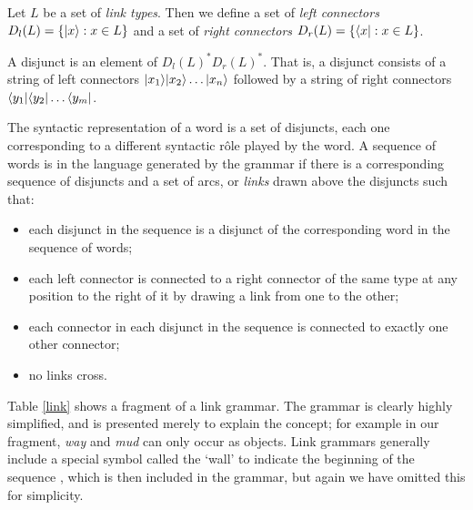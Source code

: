 \documentclass[12pt]{report}
\begin{document}
\begin{defn}
Let $L$ be a set of \emph{link types}. Then we define a set of \emph{left connectors} $D_l(L) = \{|x \rangle : x \in L\}$ and a set of \emph{right connectors} $D_r(L) = \{\langle x| : x \in L\}$.

A disjunct is an element of $D_l(L)^*D_r(L)^*$. That is, a disjunct consists of a string of left connectors $|x_1 \rangle|x_2 \rangle\ldots|x_n \rangle$ followed by a string of right connectors $\langle y_1|\langle y_2|\ldots\langle y_m|$.

The syntactic representation of a word is a set of disjuncts, each one corresponding to a different syntactic r\^ole played by the word. A sequence of words is in the language generated by the grammar if there is a corresponding sequence of disjuncts and a set of arcs, or \emph{links} drawn above the disjuncts such that:
\begin{itemize}
\item each disjunct in the sequence is a disjunct of the corresponding word in the sequence of words;
\item each left connector is connected to a right connector of the same type at any position to the right of it by drawing a link from one to the other;
\item each connector in each disjunct in the sequence is connected to exactly one other connector;
\item no links cross.
\end{itemize}
\end{defn}

Table \ref{link} shows a fragment of a link grammar. The grammar is clearly highly simplified, and is presented merely to explain the concept; for example in our fragment, \emph{way} and \emph{mud} can only occur as objects. Link grammars generally include a special symbol called the `wall' to indicate the beginning of the sequence \citep{Sleator:91}, which is then included in the grammar, but again we have omitted this for simplicity.
\end{document}
